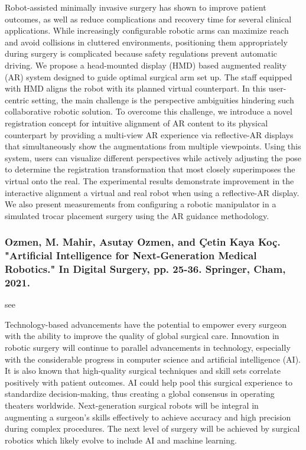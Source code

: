 \documentclass[conference]{IEEEtran}
\begin{document}
Robot-assisted minimally invasive surgery has shown to improve patient outcomes, as well as reduce complications and recovery time for several clinical applications. While increasingly configurable robotic arms can maximize reach and avoid collisions in cluttered environments, positioning them appropriately during surgery is complicated because safety regulations prevent automatic driving. We propose a head-mounted display (HMD) based augmented reality (AR) system designed to guide optimal surgical arm set up. The staff equipped with HMD aligns the robot with its planned virtual counterpart. In this user-centric setting, the main challenge is the perspective ambiguities hindering such collaborative robotic solution. To overcome this challenge, we introduce a novel registration concept for intuitive alignment of AR content to its physical counterpart by providing a multi-view AR experience via reflective-AR displays that simultaneously show the augmentations from multiple viewpoints. Using this system, users can visualize different perspectives while actively adjusting the pose to determine the registration transformation that most closely superimposes the virtual onto the real. The experimental results demonstrate improvement in the interactive alignment a virtual and real robot when using a reflective-AR display. We also present measurements from configuring a robotic manipulator in a simulated trocar placement surgery using the AR guidance methodology.


\medskip
\subsubsection{Ozmen, M. Mahir, Asutay Ozmen, and Çetin Kaya Koç. "Artificial Intelligence for Next-Generation Medical Robotics." In Digital Surgery, pp. 25-36. Springer, Cham, 2021.}
see \cite{ozmen2021artificial}

Technology-based advancements have the potential to empower every surgeon with the ability to improve the quality of global surgical care. Innovation in robotic surgery will continue to parallel advancements in technology, especially with the considerable progress in computer science and artificial intelligence (AI). It is also known that high-quality surgical techniques and skill sets correlate positively with patient outcomes. AI could help pool this surgical experience to standardize decision-making, thus creating a global consensus in operating theaters worldwide. Next-generation surgical robots will be integral in augmenting a surgeon’s skills effectively to achieve accuracy and high precision during complex procedures. The next level of surgery will be achieved by surgical robotics which likely evolve to include AI and machine learning.
\end{document}
